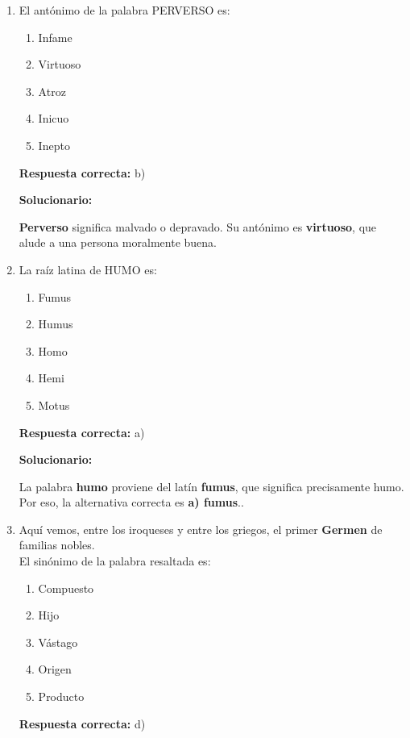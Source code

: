 \begin{enumerate}[resume]
	
	\item El antónimo de la palabra PERVERSO es:
	\begin{enumerate}[label=\alph*)]
		\item Infame
		\item Virtuoso
		\item Atroz
		\item Inicuo
		\item Inepto
	\end{enumerate}
	\textbf{Respuesta correcta:} b)
	
	\vspace{2mm}
	\textbf{Solucionario:}
	
	\textbf{Perverso} significa malvado o depravado. Su antónimo es \textbf{virtuoso}, que alude a una persona moralmente buena.
	
	\vspace{6mm}
	
	\item La raíz latina de HUMO es:
	\begin{enumerate}[label=\alph*)]
		\item Fumus
		\item Humus
		\item Homo
		\item Hemi
		\item Motus
	\end{enumerate}
	\textbf{Respuesta correcta:} a)
	
	\vspace{2mm}
	\textbf{Solucionario:}
	
	La palabra \textbf{humo} proviene del latín \textbf{fumus}, que significa precisamente humo.\\
	Por eso, la alternativa correcta es \textbf{a) fumus}..
	
	\vspace{6mm}
	
	\item Aquí vemos, entre los iroqueses y entre los griegos, el primer \textbf{Germen} de familias nobles.\\
	El sinónimo de la palabra resaltada es:
	\begin{enumerate}[label=\alph*)]
		\item Compuesto
		\item Hijo
		\item Vástago
		\item Origen
		\item Producto
	\end{enumerate}
	\textbf{Respuesta correcta:} d)
	

\end{enumerate}
